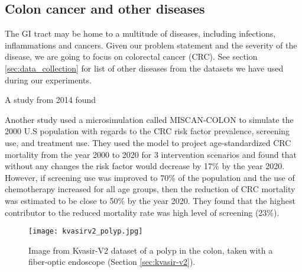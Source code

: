 \documentclass[thesis.tex]{subfiles}
\begin{document}



\subsection{Colon cancer and other diseases} \label{sec:colon_cancer}
The GI tract may be home to a multitude of diseases, including infections, inflammations and cancers. Given our problem statement and the severity of the disease, we are going to focus on colorectal cancer (CRC). See section \ref{sec:data_collection} for list of other diseases from the datasets we have used during our experiments.

A study from 2014 found 

Another study used a microsimulation called MISCAN-COLON \cite{HowMuch06} to simulate the 2000 U.S population with regards to the CRC risk factor prevalence, screening use, and treatment use. They used the model to project age-standardized CRC mortality from the year 2000 to 2020 for 3 intervention scenarios and found that without any changes the risk factor would decrease by 17\% by the year 2020. However, if screening use was improved to 70\% of the population and the use of chemotherapy increased for all age groups, then the reduction of CRC mortality was estimated to be close to 50\% by the year 2020. They found that the highest contributor to the reduced mortality rate was high level of screening (23\%).

\begin{figure}[h!] %
  \begin{center}
    \texttt{[image: kvasirv2\_polyp.jpg]}
    \caption[Image from Kvasir-V2 dataset of a polyp in the colon.]{Image from Kvasir-V2 dataset of a polyp in the colon, taken with a fiber-optic endoscope (Section \ref{sec:kvasir-v2}).}
    \label{fig:kvasirv2_polyp}
  \end{center}
\end{figure}
\end{document}

